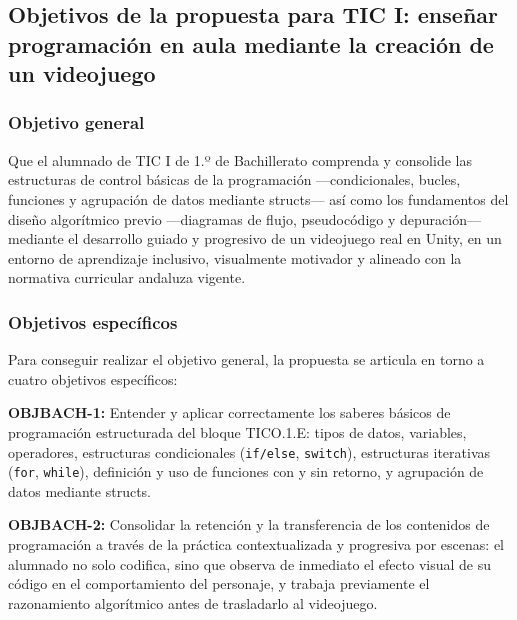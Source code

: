 \documentclass[a4paper,12pt]{article}
\begin{document}
\subsection{Objetivos de la propuesta para TIC I: enseñar programación en aula mediante la creación de un videojuego}

\subsubsection*{Objetivo general}

Que el alumnado de TIC I de 1.º de Bachillerato comprenda y consolide las estructuras de control básicas de la programación ---condicionales, bucles, funciones y agrupación de datos mediante structs--- así como los fundamentos del diseño algorítmico previo ---diagramas de flujo, pseudocódigo y depuración--- mediante el desarrollo guiado y progresivo de un videojuego real en Unity, en un entorno de aprendizaje inclusivo, visualmente motivador y alineado con la normativa curricular andaluza vigente.

\subsubsection*{Objetivos específicos}

Para conseguir realizar el objetivo general, la propuesta se articula en torno a cuatro objetivos específicos:

\textbf{OBJBACH-1:} Entender y aplicar correctamente los saberes básicos de programación estructurada del bloque TICO.1.E: tipos de datos, variables, operadores, estructuras condicionales (\texttt{if/else}, \texttt{switch}), estructuras iterativas (\texttt{for}, \texttt{while}), definición y uso de funciones con y sin retorno, y agrupación de datos mediante structs.


\textbf{OBJBACH-2:} Consolidar la retención y la transferencia de los contenidos de programación a través de la práctica contextualizada y progresiva por escenas: el alumnado no solo codifica, sino que observa de inmediato el efecto visual de su código en el comportamiento del personaje, y trabaja previamente el razonamiento algorítmico antes de trasladarlo al videojuego.
\end{document}
